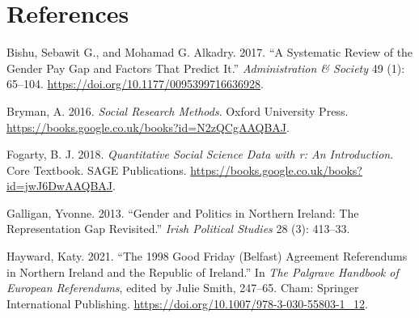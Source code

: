 \documentclass[
]{article}
\newlength{\cslhangindent}
\newlength{\cslentryspacingunit} %
\newenvironment{CSLReferences}[2] %
 {%
  \setlength{\parindent}{0pt}
  \ifodd #1
  \let\oldpar\par
  \def\par{\hangindent=\cslhangindent\oldpar}
  \fi
  \setlength{\parskip}{#2\cslentryspacingunit}
 }%
 {}
\begin{document}
\hypertarget{references}{%
\section*{References}\label{references}}

\hypertarget{refs}{}
\begin{CSLReferences}{1}{0}
\leavevmode{}%
Bishu, Sebawit G., and Mohamad G. Alkadry. 2017. {``A Systematic Review
of the Gender Pay Gap and Factors That Predict It.''}
\emph{Administration \& Society} 49 (1): 65--104.
\url{https://doi.org/10.1177/0095399716636928}.

\leavevmode{}%
Bryman, A. 2016. \emph{Social Research Methods}. Oxford University
Press. \url{https://books.google.co.uk/books?id=N2zQCgAAQBAJ}.

\leavevmode{}%
Fogarty, B. J. 2018. \emph{Quantitative Social Science Data with r: An
Introduction}. Core Textbook. SAGE Publications.
\url{https://books.google.co.uk/books?id=jwJ6DwAAQBAJ}.

\leavevmode{}%
Galligan, Yvonne. 2013. {``Gender and Politics in Northern Ireland: The
Representation Gap Revisited.''} \emph{Irish Political Studies} 28 (3):
413--33.

\leavevmode{}%
Hayward, Katy. 2021. {``The 1998 Good Friday (Belfast) Agreement
Referendums in Northern Ireland and the Republic of Ireland.''} In
\emph{The Palgrave Handbook of European Referendums}, edited by Julie
Smith, 247--65. Cham: Springer International Publishing.
\url{https://doi.org/10.1007/978-3-030-55803-1_12}.

\end{CSLReferences}
\end{document}
